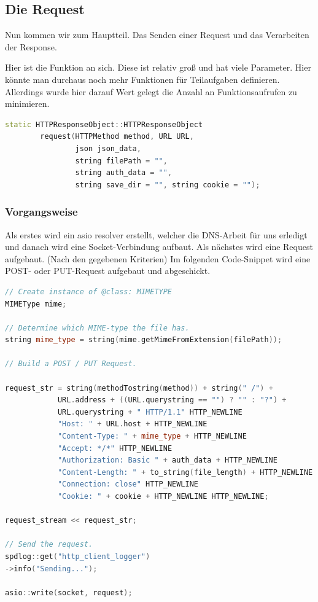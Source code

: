 \documentclass{article}
\begin{document}
\subsection{Die Request}
Nun kommen wir zum Hauptteil. Das Senden einer Request und das Verarbeiten der Response. 

\noindent Hier ist die Funktion an sich. Diese ist relativ groß und hat viele Parameter. Hier könnte man durchaus noch mehr Funktionen für Teilaufgaben definieren. Allerdings wurde hier darauf Wert gelegt die Anzahl an Funktionsaufrufen zu minimieren. 
\begin{lstlisting}[language=C++]
static HTTPResponseObject::HTTPResponseObject 
        request(HTTPMethod method, URL URL, 
                json json_data, 
                string filePath = "", 
                string auth_data = "", 
                string save_dir = "", string cookie = "");
\end{lstlisting}

\newpage
\subsubsection{Vorgangsweise}
Als erstes wird ein asio resolver erstellt, welcher die DNS-Arbeit für uns erledigt und danach wird eine Socket-Verbindung aufbaut.
\noindent Als nächstes wird eine Request aufgebaut. (Nach den gegebenen Kriterien)
Im folgenden Code-Snippet wird eine POST- oder PUT-Request aufgebaut und abgeschickt.\cite{asio}
\begin{lstlisting}[language=C++]
// Create instance of @class: MIMETYPE
MIMEType mime;

// Determine which MIME-type the file has.
string mime_type = string(mime.getMimeFromExtension(filePath));

// Build a POST / PUT Request.

request_str = string(methodTostring(method)) + string(" /") +
            URL.address + ((URL.querystring == "") ? "" : "?") +
            URL.querystring + " HTTP/1.1" HTTP_NEWLINE 
            "Host: " + URL.host + HTTP_NEWLINE
            "Content-Type: " + mime_type + HTTP_NEWLINE
            "Accept: */*" HTTP_NEWLINE
            "Authorization: Basic " + auth_data + HTTP_NEWLINE
            "Content-Length: " + to_string(file_length) + HTTP_NEWLINE
            "Connection: close" HTTP_NEWLINE 
            "Cookie: " + cookie + HTTP_NEWLINE HTTP_NEWLINE;
            
request_stream << request_str;

// Send the request.
spdlog::get("http_client_logger")
->info("Sending...");

asio::write(socket, request);
\end{lstlisting}
\cite{spdlog}\vspace{1em}
\end{document}
